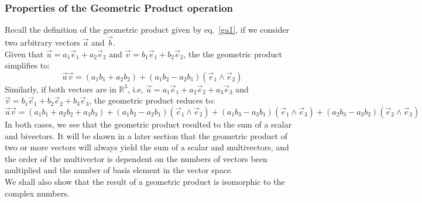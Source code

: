 \documentclass[12pt,onecolumn,letterpaper]{article} %
\begin{document}
\subsubsection{Properties of the Geometric Product operation}
Recall the definition of the geometric product given by eq.~\ref{ga1}, if we consider two arbitrary vectors $\vec{a}$ and $\vec{b}$.\\
Given that $\vec{u}=a_1\vec{e}_1+a_2\vec{e}_2$ and $\vec{v}=b_1\vec{e}_1+b_2\vec{e}_2$, the the geometric product simplifies to:
$$\vec{u}\vec{v}=(a_1b_1+a_2b_2)+(a_1b_2-a_2b_1)(\vec{e}_1\wedge\vec{e}_2)$$
Similarly, if both vectors are in $\mathbb{R}^3$, i.e,  $\vec{u}=a_1\vec{e}_1+a_2\vec{e}_2+a_3\vec{e}_3$ and $\vec{v}=b_1\vec{e}_1+b_2\vec{e}_2+b_3\vec{e}_3$, the geometric product reduces to:
$$\vec{u}\vec{v}=(a_1b_1+a_2b_2+a_3b_3)+(a_1b_2-a_2b_1)(\vec{e}_1\wedge\vec{e}_2)+(a_1b_3-a_3b_1)(\vec{e}_1\wedge\vec{e}_3)+(a_2b_3-a_3b_2)(\vec{e}_2\wedge\vec{e}_3)$$
In both cases, we see that the geometric product resulted to the sum of a scalar and bivectors. It will be shown in a later section that the geometric product of two or more vectors will always yield the sum of a scalar and multivectors, and the order of the multivector is dependent on the numbers of vectors been multiplied and the number of basis element in the vector space.\\
We shall also show that the result of a geometric product is isomorphic to the complex numbers.\\
\end{document}
